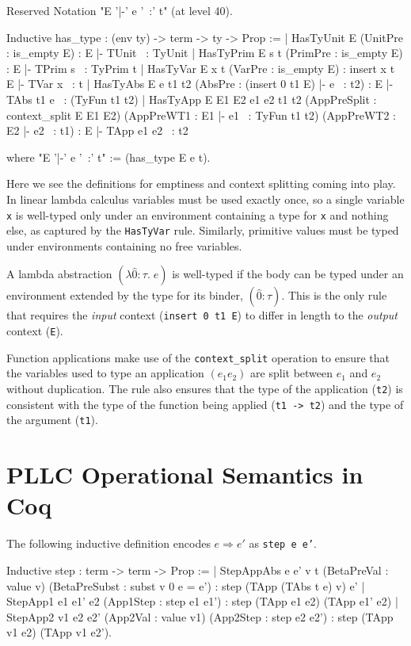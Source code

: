 \documentclass[]{unswthesis}
\newcommand{\steps}{\Rightarrow}
\let\c\texttt
\let\i\textit
\begin{document}
\begin{coqcode}
Reserved Notation "E '|-' e '~:' t" (at level 40).

Inductive has_type : (env ty) -> term -> ty -> Prop :=
  | HasTyUnit E
      (UnitPre : is_empty E) :
      E |- TUnit ~: TyUnit
  | HasTyPrim E s t
      (PrimPre : is_empty E) :
      E |- TPrim s ~: TyPrim t
  | HasTyVar E x t
      (VarPre : is_empty E) :
      insert x t E |- TVar x ~: t
  | HasTyAbs E e t1 t2
      (AbsPre : (insert 0 t1 E) |- e ~: t2) :
      E |- TAbs t1 e ~: (TyFun t1 t2)
  | HasTyApp E E1 E2 e1 e2 t1 t2
      (AppPreSplit : context_split E E1 E2)
      (AppPreWT1 : E1 |- e1 ~: TyFun t1 t2)
      (AppPreWT2 : E2 |- e2 ~: t1) :
      E  |- TApp e1 e2 ~: t2

where "E '|-' e '~:' t" := (has_type E e t).
\end{coqcode}

Here we see the definitions for emptiness and context splitting coming into play. In linear lambda calculus variables must be used exactly once, so a single variable \c{x} is well-typed only under an environment containing a type for \c{x} and nothing else, as captured by the \c{HasTyVar} rule. Similarly, primitive values must be typed under environments containing no free variables.

A lambda abstraction $(\lambda \hat{0} : \tau. \; e)$ is well-typed if the body can be typed under an environment extended by the type for its binder, $(\hat{0} : \tau)$. This is the only rule that requires the \i{input} context (\c{insert 0 t1 E}) to differ in length to the \i{output} context (\c{E}).

Function applications make use of the \c{context_split} operation to ensure that the variables used to type an application $(e_1 e_2)$ are split between $e_1$ and $e_2$ without duplication. The rule also ensures that the type of the application (\c{t2}) is consistent with the type of the function being applied (\c{t1 -> t2}) and the type of the argument (\c{t1}).

\section{PLLC Operational Semantics in Coq}
\label{app:pllc-op-sems}

The following inductive definition encodes $e \steps e'$ as \c{step e e'}.

\begin{coqcode}
Inductive step : term -> term -> Prop :=
  | StepAppAbs e e' v t
      (BetaPreVal : value v)
      (BetaPreSubst : subst v 0 e = e') :
      step (TApp (TAbs t e) v) e'
  | StepApp1 e1 e1' e2
      (App1Step : step e1 e1') :
      step (TApp e1 e2) (TApp e1' e2)
  | StepApp2 v1 e2 e2'
      (App2Val : value v1)
      (App2Step : step e2 e2') :
      step (TApp v1 e2) (TApp v1 e2').
\end{coqcode}
\end{document}
